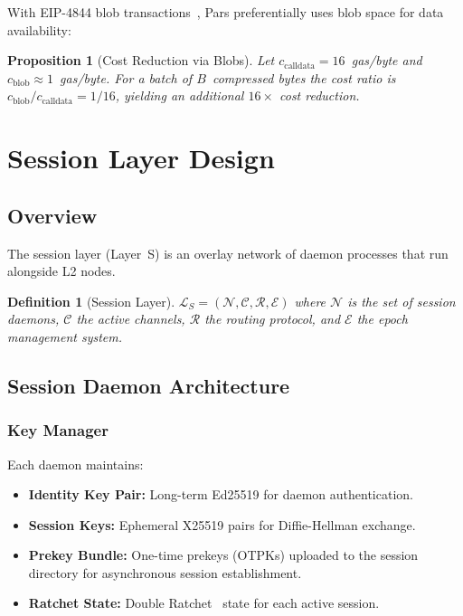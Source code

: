 \documentclass[11pt,a4paper]{article}
\newtheorem{definition}{Definition}[section]
\newtheorem{proposition}{Proposition}[section]
\begin{document}
With EIP-4844 blob transactions~\cite{eip4844}, Pars preferentially uses
blob space for data availability:

\begin{proposition}[Cost Reduction via Blobs]
    Let $c_{\mathrm{calldata}} = 16$~gas/byte and
    $c_{\mathrm{blob}} \approx 1$~gas/byte.
    For a batch of $B$~compressed bytes the cost ratio is
    $c_{\mathrm{blob}} / c_{\mathrm{calldata}} = 1/16$,
    yielding an additional $16\times$ cost reduction.
\end{proposition}

\section{Session Layer Design}
\label{sec:session}

\subsection{Overview}

The session layer (Layer~S) is an overlay network of daemon processes that
run alongside L2 nodes.

\begin{definition}[Session Layer]
    $\mathcal{L}_S = (\mathcal{N}, \mathcal{C}, \mathcal{R}, \mathcal{E})$
    where $\mathcal{N}$ is the set of session daemons, $\mathcal{C}$ the
    active channels, $\mathcal{R}$ the routing protocol, and
    $\mathcal{E}$ the epoch management system.
\end{definition}

\subsection{Session Daemon Architecture}

\subsubsection{Key Manager}

Each daemon maintains:

\begin{itemize}
    \item \textbf{Identity Key Pair:} Long-term Ed25519 for daemon
    authentication.
    \item \textbf{Session Keys:} Ephemeral X25519 pairs for
    Diffie-Hellman exchange.
    \item \textbf{Prekey Bundle:} One-time prekeys (OTPKs) uploaded to the
    session directory for asynchronous session establishment.
    \item \textbf{Ratchet State:} Double
    Ratchet~\cite{marlinspike2016signal} state for each active session.
\end{itemize}
\end{document}
